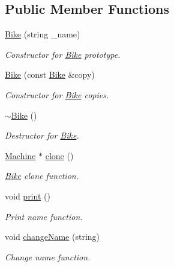 \subsection*{Public Member Functions}
\begin{DoxyCompactItemize}
\item 
\hyperlink{class_bike_ad939a72af830128eef933a6aae2b6a67}{Bike} (string \+\_\+name)
\begin{DoxyCompactList}\small\item\em Constructor for \hyperlink{class_bike}{Bike} prototype. \end{DoxyCompactList}\item 
\hyperlink{class_bike_a7707ee6f2cc666cd7eb6f076779de089}{Bike} (const \hyperlink{class_bike}{Bike} \&copy)
\begin{DoxyCompactList}\small\item\em Constructor for \hyperlink{class_bike}{Bike} copies. \end{DoxyCompactList}\item 
\hypertarget{class_bike_aaa9b2dad18f1576519a0d9c7afe425b7}{}\hyperlink{class_bike_aaa9b2dad18f1576519a0d9c7afe425b7}{$\sim$\+Bike} ()\label{class_bike_aaa9b2dad18f1576519a0d9c7afe425b7}

\begin{DoxyCompactList}\small\item\em Destructor for \hyperlink{class_bike}{Bike}. \end{DoxyCompactList}\item 
\hyperlink{class_machine}{Machine} $\ast$ \hyperlink{class_bike_afa7db5dc0a537829e8f5ec0d0b241b3f}{clone} ()
\begin{DoxyCompactList}\small\item\em \hyperlink{class_bike}{Bike} clone function. \end{DoxyCompactList}\item 
void \hyperlink{class_bike_aabdef60bdefd4d4d07a3abdcfc83e6f4}{print} ()
\begin{DoxyCompactList}\small\item\em Print name function. \end{DoxyCompactList}\item 
void \hyperlink{class_bike_a2b74c0aad112737a663bcc85bd5f7712}{change\+Name} (string)
\begin{DoxyCompactList}\small\item\em Change name function. \end{DoxyCompactList}\end{DoxyCompactItemize}


